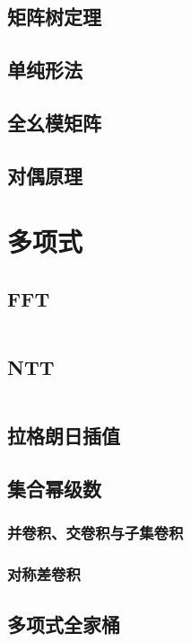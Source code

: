 \documentclass[12pt, a4paper, oneside]{ctexart}
\begin{document}
\begin{multicols}{2}
        \subsection{矩阵树定理}
        
        \subsection{单纯形法}
        
        \subsection{全幺模矩阵}
        
        \subsection{对偶原理}
        
        \newpage

        \section{多项式}
        \subsection{FFT}
        \inputminted{cpp}{src/poly/fft.cpp}
        \subsection{NTT}
        \inputminted{cpp}{src/poly/ntt.cpp}
        \subsection{拉格朗日插值}
        
        \subsection{集合幂级数}
        \subsubsection{并卷积、交卷积与子集卷积}
        
        \subsubsection{对称差卷积}
        
        \subsection{多项式全家桶}
        \inputminted{cpp}{src/poly/poly.cpp}
        \newpage


\end{multicols}
\end{document}
